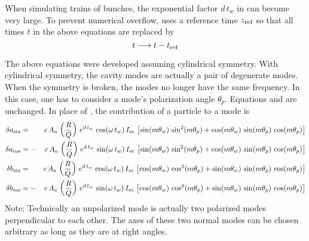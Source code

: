 When simulating trains of bunches, the exponential factor $d \, t_w$ in  can
become very large. To prevent numerical overflow, \bmad uses a reference time $z_{\text{ref}}$ so
that all times $t$ in the above equations are replaced by
\begin{equation}
  t \longrightarrow t - t_{\text{ref}}
  \label{ttt}
\end{equation}

The above equations were developed assuming cylindrical symmetry. With cylindrical symmetry, the
cavity modes are actually a pair of degenerate modes. When the symmetry is broken, the modes no
longer have the same frequency. In this case, one has to consider a mode's polarization angle
$\theta_p$. Equations  and  are unchanged.  In place of , the
contribution of a particle to a mode is
\begin{alignat}{2}
  \delta a_{\sin} &=  & c \, A_a \, \left( \frac{R}{Q} \right) \,
    e^{d \, t_w} \, \cos (\omega \, t_w) \, I_m \, \left[
    \sin(m \theta_w) \, \sin^2(m \theta_p) + 
    \cos(m \theta_w) \, \sin(m \theta_p) \, \cos(m\theta_p) \right]
    \nonumber \\
  \delta a_{\cos} &= -& c \, A_a \, \left( \frac{R}{Q} \right) \,
    e^{d \, t_w} \, \sin (\omega \, t_w) \, I_m \, \left[ 
    \sin(m \theta_w) \, \sin^2(m \theta_p) + 
    \cos(m \theta_w) \, \sin(m \theta_p) \, \cos(m\theta_p) \right]
    \\
  \delta b_{\sin} &=  & c \, A_a \, \left( \frac{R}{Q} \right) \,
    e^{d \, t_w} \, \cos (\omega \, t_w) \, I_m \, \left[
    \cos(m \theta_w) \, \cos^2(m \theta_p) + 
    \sin(m \theta_w) \, \sin(m \theta_p) \, \cos(m\theta_p) \right]
    \nonumber \\
  \delta b_{\cos} &= -& c \, A_a \, \left( \frac{R}{Q} \right) \,
    e^{d \, t_w} \, \sin (\omega \, t_w) \, I_m \, \left[
    \cos(m \theta_w) \, \cos^2(m \theta_p) + 
    \sin(m \theta_w) \, \sin(m \theta_p) \, \cos(m\theta_p) \right]
    \nonumber
\end{alignat}
Note: Technically an unpolarized mode is actually two polarized modes perpendicular to each
other. The axes of these two normal modes can be chosen arbitrary as long as they are at
right angles.
